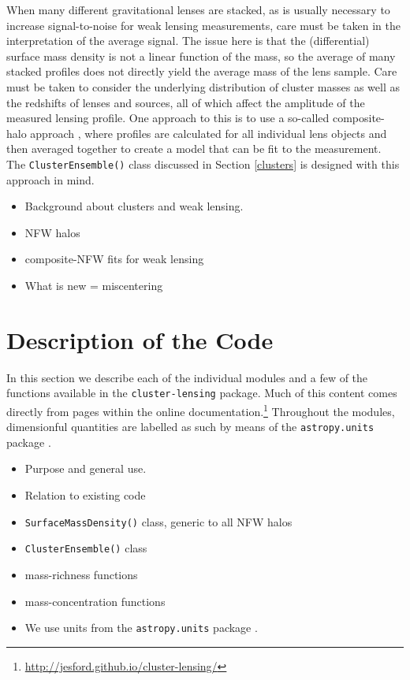 \documentclass{emulateapj}
\newcommand{\code}{\lstinline[style=codeintext]}
\begin{document}
When many different gravitational lenses are stacked, as is usually necessary to increase signal-to-noise for weak lensing measurements, care must be taken in the interpretation of the average signal. The issue here is that the (differential) surface mass density is not a linear function of the mass, so the average of many stacked profiles does not directly yield the average mass of the lens sample. Care must be taken to consider the underlying distribution of cluster masses as well as the redshifts of lenses and sources, all of which affect the amplitude of the measured lensing profile. One approach to this is to use a so-called composite-halo approach \citep[e.g.][]{Hildebrandt11, Ford12, Ford14, Ford15, Simet16}, where profiles are calculated for all individual lens objects and then averaged together to create a model that can be fit to the measurement. The \code{ClusterEnsemble()} class discussed in Section \ref{clusters} is designed with this approach in mind.

\begin{itemize}
\item Background about clusters and weak lensing.
\item NFW halos \citep{nfw97, Wright00}
\item composite-NFW fits for weak lensing \citep{Ford12, Ford14, Ford15}
\item What is new = miscentering \citep{Johnston07, George12, Ford14, Ford15}
\end{itemize}


\section{Description of the Code}
\label{code}

In this section we describe each of the individual modules and a few of the functions available in the \code{cluster-lensing} package. Much of this content comes directly from pages within the online documentation.\footnote{\url{http://jesford.github.io/cluster-lensing/}} Throughout the modules, dimensionful quantities are labelled as such by means of the \code{astropy.units} package \citep{astropy13}.

\begin{itemize} 
\item Purpose and general use.
\item Relation to existing code
\item \code{SurfaceMassDensity()} class, generic to all NFW halos
\item \code{ClusterEnsemble()} class
\item mass-richness functions
\item mass-concentration functions
\item We use units from the \code{astropy.units} package \citep{astropy13}.
\end{itemize}
\end{document}
